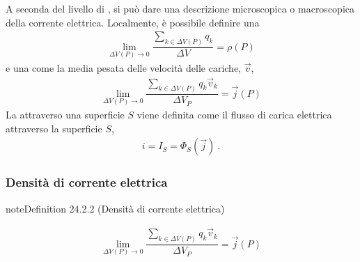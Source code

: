 \documentclass[letterpaper,10pt,italian]{jupyterBook}
\begin{document}
\sphinxAtStartPar
A seconda del livello di {\hyperref[\detokenize{ch/intro/current-status:physics-hs-intro-current-status-micro-macro}]{}}, si può dare una descrizione microscopica o macroscopica della corrente elettrica. Localmente, è possibile definire una 
\begin{equation*}
\begin{split}\lim_{\Delta V(P) \rightarrow 0} \dfrac{\sum_{k \in \Delta V(P)} q_k}{\Delta V} = \rho(P)\end{split}
\end{equation*}
\sphinxAtStartPar
e una  come la media pesata delle velocità delle cariche, \(\vec{v}\),
\begin{equation*}
\begin{split}\lim_{\Delta V(P) \rightarrow 0} \dfrac{\sum_{k \in \Delta V(P)} q_k \vec{v}_k}{\Delta V_P} = \vec{j}(P)\end{split}
\end{equation*}
\sphinxAtStartPar
La  attraverso una superficie \(S\) viene definita come il flusso di carica elettrica attraverso la superficie \(S\),
\begin{equation*}
\begin{split}i = I_{S} = \Phi_{S}(\vec{j}) \ .\end{split}
\end{equation*}

\subsubsection{Densità di corrente elettrica}
\label{\detokenize{ch/electromagnetism/electric-current:densita-di-corrente-elettrica}}\label{\detokenize{ch/electromagnetism/electric-current:electric-current-density-def}}\label{ch/electromagnetism/electric-current:electric-current-density}
\begin{sphinxadmonition}{note}{Definition 24.2.2 (Densità di corrente elettrica)}


\begin{equation*}
\begin{split}\lim_{\Delta V(P) \rightarrow 0} \dfrac{\sum_{k \in \Delta V(P)} q_k \vec{v}_k}{\Delta V_P} = \vec{j}(P)\end{split}
\end{equation*}\end{sphinxadmonition}
\end{document}
